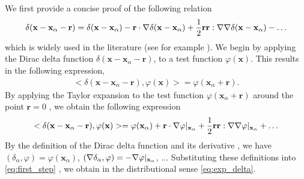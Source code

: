 We first provide a concise proof of the following relation
\begin{equation}
    \delta(\textbf{x} - \textbf{x}_\alpha - \textbf{r})
    = \delta(\textbf{x} - \textbf{x}_\alpha)
    - \textbf{r}\cdot\grad \delta(\textbf{x} - \textbf{x}_\alpha)
    + \frac{1}{2}\textbf{rr}:\grad\grad\delta(\textbf{x} - \textbf{x}_\alpha) 
    - \ldots
\label{eq:exp_delta}
\end{equation}
which is widely used in the literature (see for example \citet{zhang2023evolution}). 
We begin by applying the Dirac delta function $\delta(\textbf{x} - \textbf{x}_\alpha - \textbf{r})$, to a test function $\varphi(\textbf{x})$.
This results in the following expression,
\begin{align*}
    < \delta(\textbf{x} - \textbf{x}_\alpha - \textbf{r}), \varphi(\textbf{x})>
    =
    \varphi(\textbf{x}_\alpha + \textbf{r}).  
\end{align*}
By applying the Taylor expansion to the test function $\varphi(\textbf{x}_\alpha + \textbf{r})$ around the point $\textbf{r} = 0$ , we obtain the following expression
\begin{equation}
    <\delta(\textbf{x} - \textbf{x}_\alpha - \textbf{r}), \varphi(\textbf{x})>
    =
    \varphi(\textbf{x}_\alpha) 
    + \textbf{r} \cdot \grad \varphi|_{\textbf{x}_\alpha}
    + \frac{1}{2}\textbf{r}\textbf{r} : \grad\grad \varphi|_{\textbf{x}_\alpha}
    + \ldots
    \label{eq:first_step}
\end{equation}
By the definition of the Dirac delta function and its derivative \citep{appel2007}, we have  %
$  (\delta_\alpha, \varphi) = \varphi(\textbf{x}_\alpha)$, %
$(\mathbf{\nabla}\delta_\alpha, \varphi) = -\mathbf{\nabla}\varphi|_{\textbf{x}_\alpha} $,
$...$  
Substituting these definitions into \ref{eq:first_step} , we obtain in the distributional sense \ref{eq:exp_delta}. 

